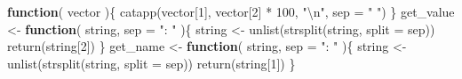 \documentclass[
]{article}
\newenvironment{Shaded}{\begin{snugshade}}{\end{snugshade}}
\newcommand{\AttributeTok}[1]{\textcolor[rgb]{0.77,0.63,0.00}{#1}}
\newcommand{\ControlFlowTok}[1]{\textcolor[rgb]{0.13,0.29,0.53}{\textbf{#1}}}
\newcommand{\DecValTok}[1]{\textcolor[rgb]{0.00,0.00,0.81}{#1}}
\newcommand{\FunctionTok}[1]{\textcolor[rgb]{0.00,0.00,0.00}{#1}}
\newcommand{\NormalTok}[1]{#1}
\newcommand{\OtherTok}[1]{\textcolor[rgb]{0.56,0.35,0.01}{#1}}
\newcommand{\SpecialCharTok}[1]{\textcolor[rgb]{0.00,0.00,0.00}{#1}}
\newcommand{\StringTok}[1]{\textcolor[rgb]{0.31,0.60,0.02}{#1}}
\begin{document}
\begin{Shaded}
\begin{Highlighting}[]
  \ControlFlowTok{function}\NormalTok{(}
\NormalTok{    vector}
\NormalTok{    )\{}
    \FunctionTok{catapp}\NormalTok{(vector[}\DecValTok{1}\NormalTok{], vector[}\DecValTok{2}\NormalTok{] }\SpecialCharTok{*} \DecValTok{100}\NormalTok{, }\StringTok{"}\SpecialCharTok{\textbackslash{}n}\StringTok{"}\NormalTok{, }\AttributeTok{sep =} \StringTok{" "}\NormalTok{)}
\NormalTok{  \}}
\NormalTok{get\_value }\OtherTok{\textless{}{-}}
  \ControlFlowTok{function}\NormalTok{(}
\NormalTok{    string,}
    \AttributeTok{sep =} \StringTok{": "}
\NormalTok{    )\{}
\NormalTok{    string }\OtherTok{\textless{}{-}} \FunctionTok{unlist}\NormalTok{(}\FunctionTok{strsplit}\NormalTok{(string, }\AttributeTok{split =}\NormalTok{ sep))}
    \FunctionTok{return}\NormalTok{(string[}\DecValTok{2}\NormalTok{])}
\NormalTok{  \}}
\NormalTok{get\_name }\OtherTok{\textless{}{-}}
  \ControlFlowTok{function}\NormalTok{(}
\NormalTok{    string,}
    \AttributeTok{sep =} \StringTok{": "}
\NormalTok{    )\{}
\NormalTok{    string }\OtherTok{\textless{}{-}} \FunctionTok{unlist}\NormalTok{(}\FunctionTok{strsplit}\NormalTok{(string, }\AttributeTok{split =}\NormalTok{ sep))}
    \FunctionTok{return}\NormalTok{(string[}\DecValTok{1}\NormalTok{])}
\NormalTok{  \}}
\end{Highlighting}
\end{Shaded}
\end{document}
